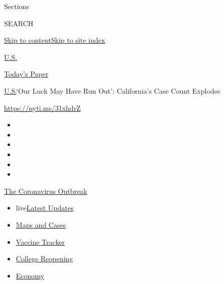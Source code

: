 Sections

SEARCH

\protect\hyperlink{site-content}{Skip to
content}\protect\hyperlink{site-index}{Skip to site index}

\href{https://www.nytimes3xbfgragh.onion/section/us}{U.S.}

\href{https://myaccount.nytimes3xbfgragh.onion/auth/login?response_type=cookie\&client_id=vi}{}

\href{https://www.nytimes3xbfgragh.onion/section/todayspaper}{Today's
Paper}

\href{/section/us}{U.S.}\textbar{}`Our Luck May Have Run Out':
California's Case Count Explodes

\url{https://nyti.ms/31xhdrZ}

\begin{itemize}
\item
\item
\item
\item
\item
\item
\end{itemize}

\href{https://www.nytimes3xbfgragh.onion/news-event/coronavirus?action=click\&pgtype=Article\&state=default\&region=TOP_BANNER\&context=storylines_menu}{The
Coronavirus Outbreak}

\begin{itemize}
\tightlist
\item
  live\href{https://www.nytimes3xbfgragh.onion/2020/08/04/world/coronavirus-cases.html?action=click\&pgtype=Article\&state=default\&region=TOP_BANNER\&context=storylines_menu}{Latest
  Updates}
\item
  \href{https://www.nytimes3xbfgragh.onion/interactive/2020/us/coronavirus-us-cases.html?action=click\&pgtype=Article\&state=default\&region=TOP_BANNER\&context=storylines_menu}{Maps
  and Cases}
\item
  \href{https://www.nytimes3xbfgragh.onion/interactive/2020/science/coronavirus-vaccine-tracker.html?action=click\&pgtype=Article\&state=default\&region=TOP_BANNER\&context=storylines_menu}{Vaccine
  Tracker}
\item
  \href{https://www.nytimes3xbfgragh.onion/2020/08/02/us/covid-college-reopening.html?action=click\&pgtype=Article\&state=default\&region=TOP_BANNER\&context=storylines_menu}{College
  Reopening}
\item
  \href{https://www.nytimes3xbfgragh.onion/live/2020/08/04/business/stock-market-today-coronavirus?action=click\&pgtype=Article\&state=default\&region=TOP_BANNER\&context=storylines_menu}{Economy}
\end{itemize}

